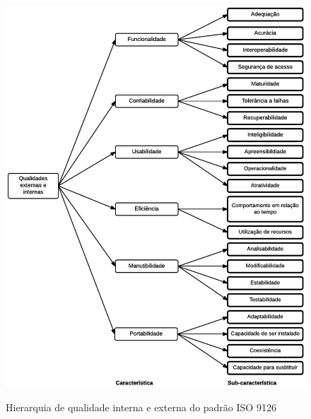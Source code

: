 \documentclass[
	12pt,				%
	openright,			%
	oneside,			%
	a4paper,			%
	english,			%
	brazil,				%
	]{abntex2}
\begin{document}
\begin{figure}[h]
    \centering
    \caption{Hierarquia de qualidade interna e externa do padrão ISO 9126}
    \graphicspath{ {./graphics/} }
    \includegraphics[scale=1.0]{iso9126-hierarquia_interno_externo-andrei}
    \label{fig:iso9126-hierarquia_interno_externo}
\end{figure}
\end{document}
